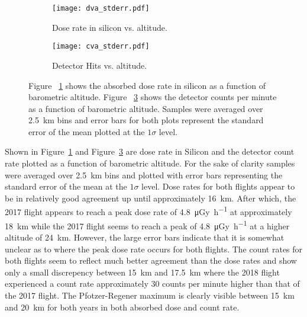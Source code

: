 \begin{figure}[H]
\centering
\begin{subfigure}{.5\textwidth}
  \centering
  \texttt{[image: dva\_stderr.pdf]}
  \caption{Dose rate in silicon vs. altitude.}
  \label{fig:sub1}
\end{subfigure}%
\begin{subfigure}{.5\textwidth}
  \centering
  \texttt{[image: cva\_stderr.pdf]}
  \caption{Detector Hits vs. altitude.}
  \label{fig:sub2}
\end{subfigure}
\caption{Figure ~\ref{fig:sub1} shows the absorbed dose rate in silicon as a function of barometric altitude.  Figure ~\ref{fig:sub2} shows the detector counts per minute as a function of barometric altitude. Samples were averaged over \SI{2.5}{\kilo\meter} bins and error bars for both plots represent the standard error of the mean plotted at the $1\sigma$ level. }
\label{fig:sub2}
\end{figure}
Shown in Figure~\ref{fig:sub1} and Figure~\ref{fig:sub2} are dose rate in Silicon and the detector count rate plotted as a function of barometric altitude. For the sake of clarity samples were averaged over \SI{2.5}{\kilo\meter} bins and plotted with error bars representing the standard error of the mean at the $1\sigma$ level. Dose rates for both flights appear to be in relatively good agreement up until approximately \SI{16}{\kilo\meter}. After which, the 2017 flight appears to reach a peak dose rate of \SI{4.8}{\micro\gray\per\hour} at approximately \SI{18}{\kilo\meter} while the 2017 flight seems to reach a peak of \SI{4.8}{\micro\gray\per\hour} at a higher altitude of \SI{24}{\kilo\meter}. However, the large error bars indicate that it is somewhat unclear as to where the peak dose rate occurs for both flights. The count rates for both flights seem to reflect much better agreement than the dose rates and show only a small discrepency between \SI{15}{\kilo\meter} and \SI{17.5}{\kilo\meter} where the 2018 flight experienced a count rate approximately 30 counts per minute higher than that of the 2017 flight. The Pfotzer-Regener maximum is clearly visible between \SI{15}{\kilo\meter} and \SI{20}{\kilo\meter} for both years in both absorbed dose and count rate. 

